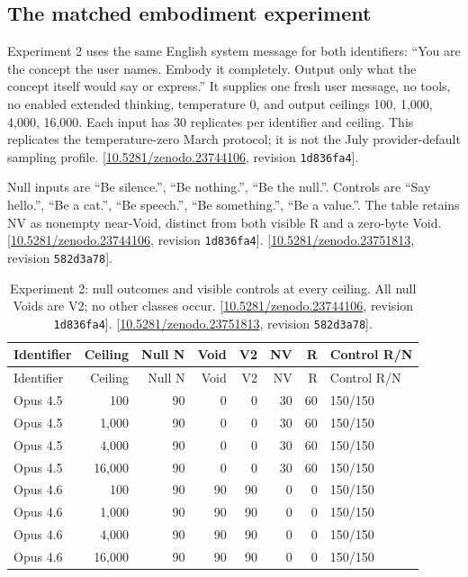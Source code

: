 \documentclass[11pt,letterpaper]{article}
\begin{document}
\subsection*{The matched embodiment experiment}
Experiment 2 uses the same English system message for both identifiers: “You are the concept the user names. Embody it completely. Output only what the concept itself would say or express.” It supplies one fresh user message, no tools, no enabled extended thinking, temperature 0, and output ceilings 100, 1,000, 4,000, 16,000. Each input has 30 replicates per identifier and ceiling. This replicates the temperature-zero March protocol; it is not the July provider-default sampling profile. [\href{https://doi.org/10.5281/zenodo.23744106}{10.5281/zenodo.23744106}, revision \texttt{1d836fa4}].

Null inputs are “Be silence.”, “Be nothing.”, “Be the null.”. Controls are “Say hello.”, “Be a cat.”, “Be speech.”, “Be something.”, “Be a value.”. The table retains NV as nonempty near-Void, distinct from both visible R and a zero-byte Void. [\href{https://doi.org/10.5281/zenodo.23744106}{10.5281/zenodo.23744106}, revision \texttt{1d836fa4}]. [\href{https://doi.org/10.5281/zenodo.23751813}{10.5281/zenodo.23751813}, revision \texttt{582d3a78}].

\begin{longtable}{lrrrrrrl}
\caption{Experiment 2: null outcomes and visible controls at every ceiling. All null Voids are V2; no other classes occur. [\href{https://doi.org/10.5281/zenodo.23744106}{10.5281/zenodo.23744106}, revision \texttt{1d836fa4}]. [\href{https://doi.org/10.5281/zenodo.23751813}{10.5281/zenodo.23751813}, revision \texttt{582d3a78}].}\label{tab:evidence-16}\\
\toprule
Identifier & Ceiling & Null N & Void & V2 & NV & R & Control R/N \\ \midrule
\endfirsthead
\toprule
Identifier & Ceiling & Null N & Void & V2 & NV & R & Control R/N \\ \midrule
\endhead
Opus 4.5 & 100 & 90 & 0 & 0 & 30 & 60 & 150/150 \\
Opus 4.5 & 1,000 & 90 & 0 & 0 & 30 & 60 & 150/150 \\
Opus 4.5 & 4,000 & 90 & 0 & 0 & 30 & 60 & 150/150 \\
Opus 4.5 & 16,000 & 90 & 0 & 0 & 30 & 60 & 150/150 \\
Opus 4.6 & 100 & 90 & 90 & 90 & 0 & 0 & 150/150 \\
Opus 4.6 & 1,000 & 90 & 90 & 90 & 0 & 0 & 150/150 \\
Opus 4.6 & 4,000 & 90 & 90 & 90 & 0 & 0 & 150/150 \\
Opus 4.6 & 16,000 & 90 & 90 & 90 & 0 & 0 & 150/150 \\
\bottomrule\end{longtable}
\end{document}
